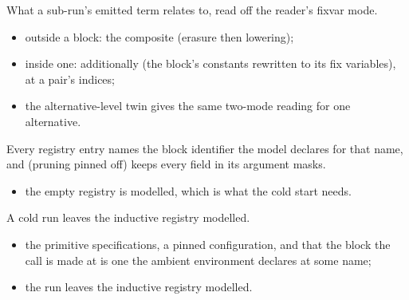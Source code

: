 \begin{definition}
\label{def:ErasesLBMode}
\leanok
{}
 What a sub-run's emitted term relates to, read off the reader's fixvar mode.
\begin{itemize}
\item outside a block: the composite  (erasure then lowering);
\item inside one: additionally  (the block's constants rewritten to its fix
variables), at a  pair's indices;
\item the alternative-level twin gives the same two-mode reading for one  alternative.
\end{itemize}
\end{definition}
\begin{definition}
\label{def:IndRegistryModelled}
\leanok
{}
 Every registry entry names the block identifier the model declares for that name, and
(pruning pinned off) keeps every field in its argument masks.
\begin{itemize}
\item the empty registry is modelled, which is what the cold start needs.
\end{itemize}
\end{definition}
\begin{lemma}
\label{lem:run_register_inductive_models}
\leanok
{}
 A cold  run leaves the inductive registry modelled.
\begin{itemize}
\item {} the primitive specifications, a pinned configuration, and that the block the call is
made at is one the ambient environment declares at some name;
\item {} the run leaves the inductive registry modelled.
\end{itemize}
\end{lemma}
